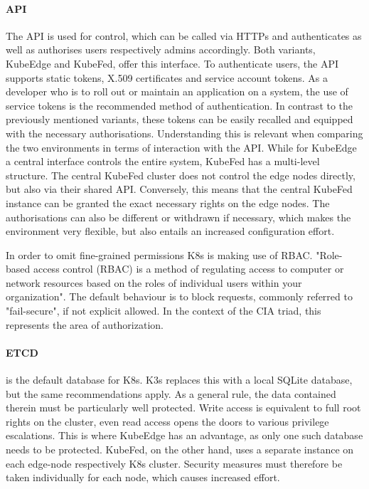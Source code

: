 \documentclass[MIC,Master,english]{twbook}%
\begin{document}
\paragraph{API} The API is used for control, which can be called via HTTPs and authenticates as well as authorises users respectively admins accordingly. Both variants, KubeEdge and KubeFed, offer this interface. To authenticate users, the API supports static tokens, X.509 certificates and service account tokens. As a developer who is to roll out or maintain an application on a system, the use of service tokens is the recommended method of authentication. In contrast to the previously mentioned variants, these tokens can be easily recalled and equipped with the necessary authorisations\cite{owasp-k8s-cheat}. Understanding this is relevant when comparing the two environments in terms of interaction with the API. While for KubeEdge a central interface controls the entire system, KubeFed has a multi-level structure. The central KubeFed cluster does not control the edge nodes directly, but also via their shared API. Conversely, this means that the central KubeFed instance can be granted the exact necessary rights on the edge nodes. The authorisations can also be different or withdrawn if necessary, which makes the environment very flexible, but also entails an increased configuration effort.\par
In order to omit fine-grained permissions \ac{K8s} is making use of \ac{RBAC}. "Role-based access control (RBAC) is a method of regulating access to computer or network resources based on the roles of individual users within your organization"\cite{k8s-rbac}. The default behaviour is to block requests, commonly referred to "fail-secure", if not explicit allowed. In the context of the CIA triad, this represents the area of authorization.

\paragraph{ETCD} is the default database for \ac{K8s}. K3s replaces this with a local SQLite database, but the same recommendations apply\cite{k3s-config}. As a general rule, the data contained therein must be particularly well protected. Write access is equivalent to full root rights on the cluster, even read access opens the doors to various privilege escalations\cite{owasp-k8s-cheat}. This is where KubeEdge has an advantage, as only one such database needs to be protected. KubeFed, on the other hand, uses a separate instance on each edge-node respectively \ac{K8s} cluster. Security measures must therefore be taken individually for each node, which causes increased effort.
\end{document}
